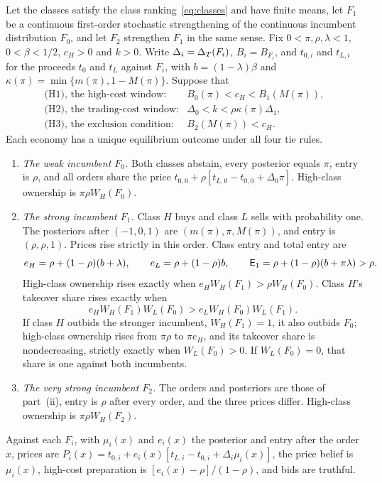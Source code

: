 \begin{proposition}\label{prop:ccc}
Let the classes satisfy the class ranking~\eqref{eq:classes} and have finite means, let \(F_1\) be a continuous
first-order stochastic strengthening of the continuous incumbent distribution \(F_0\), and let \(F_2\) strengthen
\(F_1\) in the same sense. Fix \(0<\pi,\rho,\lambda<1\), \(0<\beta<1/2\), \(c_H>0\) and \(k>0\). Write
\(\Delta_i=\Delta_T(F_i)\), \(B_i=B_{F_i}\), and \(t_{0,i}\) and \(t_{L,i}\) for the proceeds \(t_0\) and \(t_L\) against
\(F_i\), with \(b=(1-\lambda)\beta\) and \(\kappa(\pi)=\min\{m(\pi),1-M(\pi)\}\). Suppose that
\[
\begin{array}{ll}
\text{(H1), the high-cost window:}& B_0(\pi)<c_H<B_1(M(\pi)),\\
\text{(H2), the trading-cost window:}& \Delta_0<k<\rho\kappa(\pi)\Delta_1,\\
\text{(H3), the exclusion condition:}& B_2(M(\pi))<c_H.
\end{array}
\]
Each economy has a unique equilibrium outcome under all four tie rules.
\begin{enumerate}[label=(\roman*),leftmargin=2em]
\item \emph{The weak incumbent \(F_0\).} Both classes abstain, every posterior equals \(\pi\), entry is \(\rho\), and
all orders share the price \(t_{0,0}+\rho[t_{L,0}-t_{0,0}+\Delta_0\pi]\). High-class ownership is \(\pi\rho W_H(F_0)\).
\item \emph{The strong incumbent \(F_1\).} Class \(H\) buys and class \(L\) sells with probability one. The posteriors
after \((-1,0,1)\) are \((m(\pi),\pi,M(\pi))\), and entry is \((\rho,\rho,1)\). Prices rise strictly in this order.
Class entry and total entry are
\[
e_H=\rho+(1-\rho)(b+\lambda),\qquad e_L=\rho+(1-\rho)b,\qquad
\mathsf{E}_1=\rho+(1-\rho)(b+\pi\lambda)>\rho.
\]
High-class ownership rises exactly when \(e_HW_H(F_1)>\rho W_H(F_0)\). Class \(H\)'s takeover share rises exactly
when
\begin{equation}\label{eq:a3-share}
e_HW_H(F_1)W_L(F_0)>e_LW_H(F_0)W_L(F_1).
\end{equation}
If class \(H\) outbids the stronger incumbent, \(W_H(F_1)=1\), it also outbids \(F_0\); high-class ownership
rises from \(\pi\rho\) to \(\pi e_H\), and its takeover share is nondecreasing, strictly exactly when
\(W_L(F_0)>0\). If \(W_L(F_0)=0\), that share is one against both incumbents.
\item \emph{The very strong incumbent \(F_2\).} The orders and posteriors are those of part~(ii), entry is \(\rho\)
after every order, and the three prices differ. High-class ownership is \(\pi\rho W_H(F_2)\).
\end{enumerate}
Against each \(F_i\), with \(\mu_i(x)\) and \(e_i(x)\) the posterior and entry after the order \(x\), prices are
\(P_i(x)=t_{0,i}+e_i(x)[t_{L,i}-t_{0,i}+\Delta_i\mu_i(x)]\), the price belief is \(\mu_i(x)\), high-cost
preparation is \([e_i(x)-\rho]/(1-\rho)\), and bids are truthful.
\end{proposition}

